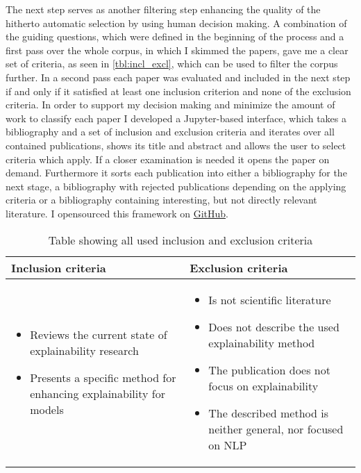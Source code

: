 \begin{enumerate}
	The next step serves as another filtering step enhancing the quality of the hitherto automatic selection by using human decision making. A combination of the guiding questions, which were defined in the beginning of the process and a first pass over the whole corpus, in which I skimmed the papers, gave me a clear set of criteria, as seen in \autoref{tbl:incl_excl}, which can be used to filter the corpus further. In a second pass each paper was evaluated and included in the next step if and only if it satisfied at least one inclusion criterion and none of the exclusion criteria.	In order to support my decision making and minimize the amount of work to classify each paper I developed a Jupyter-based interface, which takes a bibliography and a set of inclusion and exclusion criteria and iterates over all contained publications, shows its title and abstract and allows the user to select criteria which apply. If a closer examination is needed it opens the paper on demand. Furthermore it sorts each publication into either a bibliography for the next stage, a bibliography with rejected publications depending on the applying criteria or a bibliography containing interesting, but not directly relevant literature. I opensourced this framework on \href{https://github.com/wittenator/limap}{GitHub}.
	
	\begin{table}
		\centering
		\begin{tabular}{  p{5cm} | p{5cm} }
			Inclusion criteria & Exclusion criteria  \\ \hline
			
			\begin{itemize}
				\item Reviews the current state of explainability research
				\item Presents a specific method for enhancing explainability for models
			\end{itemize}
			
			&
			
			\begin{itemize}
				\item Is not scientific literature
				\item Does not describe the used explainability method
				\item The publication does not focus on explainability
				\item The described method is neither general, nor focused on NLP
			\end{itemize}
		\end{tabular}
		\caption{\label{tbl:incl_excl} Table showing all used inclusion and exclusion criteria}
	\end{table}


\end{enumerate}
